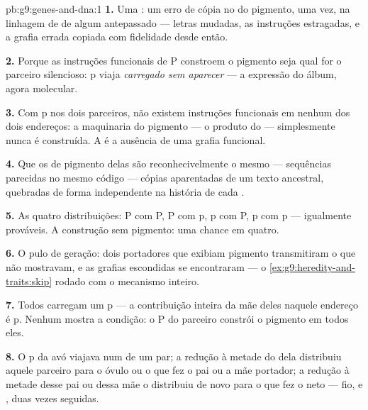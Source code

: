 \begin{solution}{pb:g9:genes-and-dna:1}
\textbf{1.} Uma : um erro de cópia no  do
pigmento, uma vez, na linhagem de  de algum
antepassado --- letras mudadas, as instruções estragadas, e a
grafia errada copiada com fidelidade desde então.

\textbf{2.} Porque as instruções funcionais de P constroem o
pigmento seja qual for o parceiro silencioso: p viaja
\emph{carregado sem aparecer} --- a expressão do álbum, agora
molecular.

\textbf{3.} Com p nos dois parceiros, não existem instruções
funcionais em nenhum dos dois endereços: a maquinaria do
pigmento --- o produto do  --- simplesmente nunca é
construída. A  é a ausência de uma grafia
funcional.

\textbf{4.} Que os  de pigmento delas são
reconhecivelmente o mesmo  --- sequências parecidas no
mesmo código --- cópias aparentadas de um texto ancestral,
quebradas de forma independente na história de cada .

\textbf{5.} As quatro distribuições: P com P, P com p, p com
P, p com p --- igualmente prováveis. A construção sem
pigmento: uma chance em quatro.

\textbf{6.} O pulo de geração: dois portadores que exibiam
pigmento transmitiram o que não mostravam, e as grafias
escondidas se encontraram --- o
\cref{ex:g9:heredity-and-traits:skip} rodado com o mecanismo
inteiro.

\textbf{7.} Todos carregam um p --- a contribuição inteira da
mãe deles naquele endereço é p. Nenhum mostra a condição: o P
do parceiro constrói o pigmento em todos eles.

\textbf{8.} O p da avó viajava num  de um par; a
redução à metade do  dela distribuiu aquele parceiro
para o óvulo ou o  que fez o pai ou a mãe
portador; a redução à metade desse pai ou dessa mãe o
distribuiu de novo para o  que fez o neto --- fio,
 e , duas vezes seguidas.


\end{solution}
